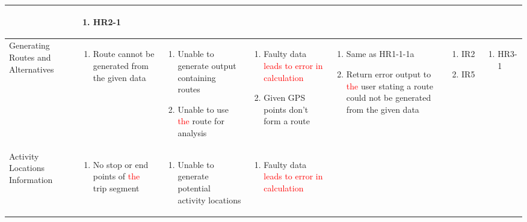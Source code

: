 \documentclass{article}
\begin{document}
\begin{landscape}
\begin{longtable}{|p{2.5cm}|p{3.5cm}|p{3.5cm}|p{3.5cm}|p{5.5cm}|p{1.8cm}|p{2cm}|}
 &
 \begin{enumerate}
     \item HR2-1
 \end{enumerate}
 \\
 \hline
 Generating Routes and Alternatives
 &   
 \begin{enumerate}
     \item Route cannot be generated from the given data
 \end{enumerate}
& 
 \begin{enumerate}[label=1\alph*.]
     \item Unable to generate output containing routes
     \item Unable to use \textcolor{red}{the} route for analysis
 \end{enumerate}
 & 
\begin{enumerate}[label=1\alph*.]
     \item Faulty data \textcolor{red}{leads to error in calculation}
     \item Given GPS points don't form a route
\end{enumerate}
 & 
\begin{enumerate}[label=1\alph*.]
      \item Same as HR1-1-1a
      \item Return error output to \textcolor{red}{the} user stating a route could not be generated from the given data
\end{enumerate}
& 
\begin{enumerate}[label=1\alph*.]
    \item IR2
    \item IR5
\end{enumerate}
&
 \begin{enumerate}
     \item HR3-1
 \end{enumerate}
\\
\hline
Activity Locations Information
& 
\begin{enumerate}
    \item No stop or end points of \textcolor{red}{the} trip segment
\end{enumerate}
& 
\begin{enumerate}
    \item Unable to generate potential activity locations
\end{enumerate}
& 
\begin{enumerate}[label=1\alph*.]
    \item Faulty data \textcolor{red}{leads to error in calculation}

\end{enumerate}
\end{longtable}
\end{landscape}
\end{document}
